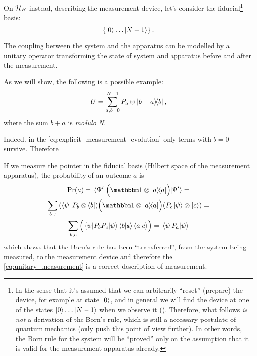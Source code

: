 On $\mathcal{H}_B$ instead, describing the measurement device, let's consider
the fiducial\footnote{
  In the sense that it's assumed
  that we can arbitrarily ``reset'' (prepare) the device,
  for example at state $\ket{0}$,
  and in general
  we will find the device at one of the states
  $\ket{0}\dots\ket{N-1}$
  when we observe it ().
  Therefore, what follows \emph{is not} a derivation of the Born's rule,
  which is still a necessary postulate of quantum mechanics
  (only \cite{Zurek_Decoherence, Zurek_Einselect, Zurek_Fundamentals} push
  this point of view further). In other words, the Born rule for the system
  will be ``proved''
  only on the assumption that it is valid for the measurement apparatus already.
}
basis:
\[
  \left\{\ket{0} \dots \ket{N-1}\right\} \text{.}
\]

The coupling between the system and the apparatus
can be modelled by
a unitary operator
transforming the state of system and apparatus before and after the measurement.

As we will show, the following is a possible example:
\begin{equation}\label{eq:unitary_measurement}
  U = \sum_{a, b = 0}^{N-1} P_a \otimes \ketbra{b+a}{b} \text{,}
\end{equation}
where the sum $b+a$ is \emph{modulo N}.

Indeed, in the \ref{eq:explicit_measurement_evolution} only terms with $b=0$ survive.
Therefore

If we measure the pointer in the fiducial basis
(Hilbert space of the measurement apparatus),
the probability of an outcome $a$ is
\begin{multline}\label{eq:measurement_probability}
  \Pr(a) = \expval{\qty\Big(\idop\ox\ketbra{a})}{\Psi^{\prime}} = \\
    \sum_{b,c}
      \qty(\bra{\psi}P_{b}\ox\bra{b})
      \qty\Big(\idop\ox\ketbra{a})
      \qty(P_{c}\ket{\psi}\ox\ket{c}) = \\
    \sum_{b,c}\qty\Big(\expval{P_bP_c}{\psi} \braket{b}{a} \braket{a}{c}) =
    \expval{P_a}{\psi}
\end{multline}
which shows that the Born's rule has been ``transferred'', from the system being
measured, to the measurement device and therefore the
\eqref{eq:unitary_measurement} is a correct description of measurement.

